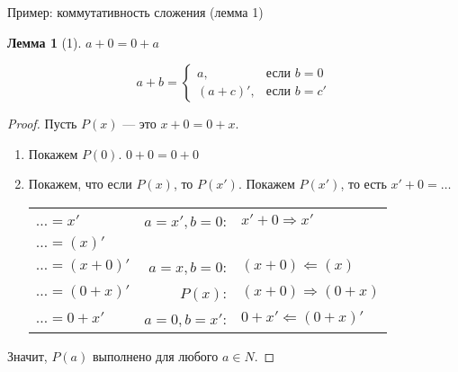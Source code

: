 \documentclass[handout]{beamer}
\newtheorem{lmm}{Лемма}[section]
\begin{document}
\begin{frame}{Пример: коммутативность сложения (лемма 1)}

\begin{multicols}{2}
\begin{lmm}[1]
$a + 0 = 0 + a$
\end{lmm} \pause
{\color{gray}
$$a + b = \left\{ \begin{array}{ll} a, & \mbox{если } b = 0\\
                                    (a + c)', & \mbox{если } b = c'
                  \end{array}\right.$$} \end{multicols}\pause
\vspace{-1.5cm}\begin{proof} Пусть $P(x)$ --- это $x + 0 = 0 + x$.
\begin{enumerate}\pause
\item Покажем $P(0)$. $0 + 0 = 0 + 0$ \pause
\item Покажем, что если $P(x)$, то $P(x')$. Покажем $P(x')$, то есть $x' + 0 = \dots$ \pause

\begin{center}
  \begin{tabular}{lrl} %
                      $\dots = x'$ & $a=x',b=0$: & $x' + 0 \Rightarrow x'$ \\\pause
                      $\dots = (x)'$ & \\ \pause
                      $\dots = (x + 0)'$ & $a=x,b=0$: &$(x + 0) \Leftarrow (x)$ \\ \pause
                      $\dots = (0 + x)'$ & $P(x)$: &$(x + 0) \Rightarrow (0 + x)$ \\ \pause
                      $\dots = 0 + x'$ & $a=0,b=x'$: &$0 + x' \Leftarrow (0 + x)'$
   \end{tabular}
\end{center}
\end{enumerate}\pause
Значит, $P(a)$ выполнено для любого $a \in N$.
\end{proof}
\end{frame}
\end{document}
